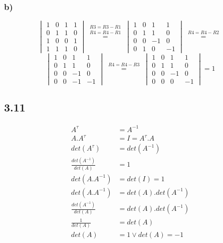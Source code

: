 \documentclass[11pt]{article}
\begin{document}
\subsubsection*{b)}
\[
\begin{vmatrix}
1 & 0 & 1 & 1 \\
0 & 1 & 1 & 0 \\
1 & 0 & 0 & 1 \\
1 & 1 & 1 & 0
\end{vmatrix}
\overset{\begin{matrix}
R3=R3-R1\\
R4=R4-R1
\end{matrix}}{=}
\begin{vmatrix}
1 & 0 & 1 & 1 \\
0 & 1 & 1 & 0 \\
0 & 0 & -1 & 0 \\
0 & 1 & 0 & -1
\end{vmatrix}
\overset{\begin{matrix}
R4=R4-R2
\end{matrix}}{=}
\]\[
\begin{vmatrix}
1 & 0 & 1 & 1 \\
0 & 1 & 1 & 0 \\
0 & 0 & -1 & 0 \\
0 & 0 & -1 & -1
\end{vmatrix}
\overset{\begin{matrix}
R4=R4-R3
\end{matrix}}{=}
\begin{vmatrix}
1 & 0 & 1 & 1 \\
0 & 1 & 1 & 0 \\
0 & 0 & -1 & 0 \\
0 & 0 & 0 & -1
\end{vmatrix}=1
\]

\subsection*{3.11}
\begin{align}
  A^\tau &= A^{-1} \tag{1. Definitie orthogonale matrix}\\
  A.A^\tau &= I = A^\tau.A \tag{2. Direct gevolg van definitie}\\
  det(A^\tau) &= det(A^{-1}) \tag{3. (uit 1.)}\\
  \frac{det(A^{-1})}{det(A)} &= 1 \tag{4. (uit 3.)}\\
  det(A.A^{-1}) &= det(I) = 1 \tag{5. (uit 2.)}\\
  det(A.A^{-1}) &= det(A).det(A^{-1}) \tag{6. eigenschap determinant}\\
  \frac{det(A^{-1})}{det(A)} &= det(A).det(A^{-1}) \tag{7. (uit 4. en 5.)}\\
  \frac{1}{det(A)} &= det(A) \tag{8.}\\
  det(A) &= 1 \vee det(A) = -1 \tag{9.}
\end{align}
\end{document}
